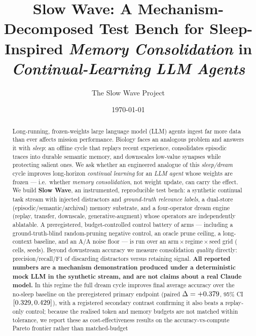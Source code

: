 \title{\textbf{Slow Wave}: A Mechanism-Decomposed Test Bench for
Sleep-Inspired \emph{Memory Consolidation} in \emph{Continual-Learning}
\emph{LLM Agents}}

\author{The Slow Wave Project}
\date{\today}
\maketitle

\begin{abstract}
Long-running, frozen-weights large language model (LLM) agents ingest far more
data than ever affects mission performance. Biology faces an analogous problem
and answers it with \emph{sleep}: an offline cycle that replays recent
experience, consolidates episodic traces into durable semantic memory, and
downscales low-value synapses while protecting salient ones. We ask whether an
engineered analogue of this \emph{sleep/dream} cycle improves long-horizon
\emph{continual learning} for an \emph{LLM agent} whose weights are frozen ---
i.e.\ whether \emph{memory consolidation}, not weight update, can carry the
effect. We build \textbf{Slow Wave}, an instrumented, reproducible test bench:
a synthetic continual task stream with injected distractors and
\emph{ground-truth relevance labels}, a dual-store (episodic/semantic/archival)
memory substrate, and a four-operator dream engine (replay, transfer,
downscale, generative-augment) whose operators are independently ablatable. A
preregistered, budget-controlled control battery of \SWnArms{} arms --- including a
ground-truth-blind random-pruning negative control, an oracle prune ceiling, a
long-context baseline, and an A/A noise floor --- is run over an
arm\,$\times$\,regime\,$\times$\,seed grid (\SWnCells{} cells,
\SWnSeeds{} seeds). Beyond downstream accuracy we measure consolidation
\emph{quality} directly: precision/recall/F1 of discarding distractors versus
retaining signal. \textbf{All reported numbers are a mechanism demonstration
produced under a deterministic mock LLM in the synthetic stream, and are not
claims about a real Claude model.} In this regime the full dream cycle improves
final average accuracy over the no-sleep baseline on the preregistered primary
endpoint (paired $\Delta=+0.379$, 95\% CI
$[0.329,0.429]$), with a registered secondary contrast confirming
it also beats a replay-only control; because the realised token and memory
budgets are not matched within tolerance, we report these as cost-effectiveness
results on the accuracy-vs-compute Pareto frontier rather than matched-budget

\end{abstract}
